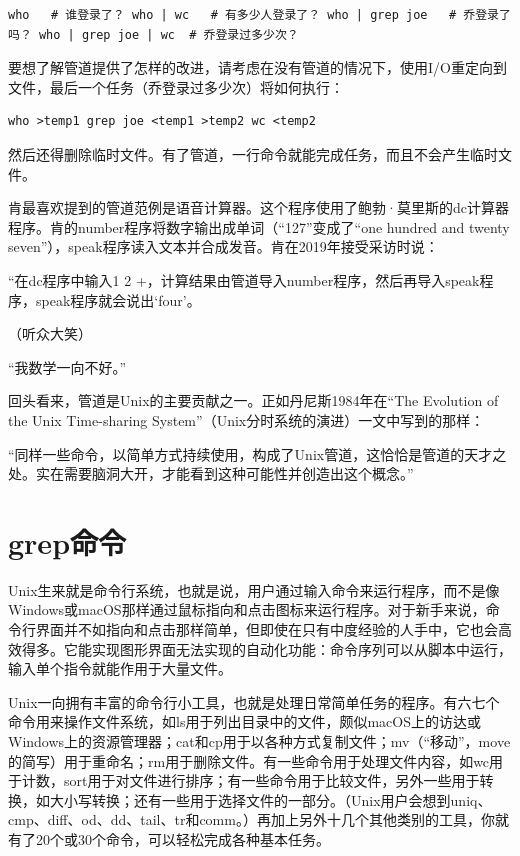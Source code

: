 \documentclass[a4paper,12pt,UTF8,twoside]{ctexbook}
\begin{document}
\begin{lstlisting}
who   # 谁登录了？ who | wc   # 有多少人登录了？ who | grep joe   # 乔登录了吗？ who | grep joe | wc  # 乔登录过多少次？
\end{lstlisting}

要想了解管道提供了怎样的改进，请考虑在没有管道的情况下，使用I/O重定向到文件，最后一个任务（乔登录过多少次）将如何执行：

\begin{lstlisting}
who >temp1 grep joe <temp1 >temp2 wc <temp2
\end{lstlisting}

然后还得删除临时文件。有了管道，一行命令就能完成任务，而且不会产生临时文件。

肯最喜欢提到的管道范例是语音计算器。这个程序使用了鲍勃·莫里斯的dc计算器程序。肯的number程序将数字输出成单词（“127”变成了“one hundred and twenty seven”），speak程序读入文本并合成发音。肯在2019年接受采访时说：

“在dc程序中输入1 2 +，计算结果由管道导入number程序，然后再导入speak程序，speak程序就会说出‘four’。

（听众大笑）

“我数学一向不好。”

回头看来，管道是Unix的主要贡献之一。正如丹尼斯1984年在“The Evolution of the Unix Time-sharing System”（Unix分时系统的演进）一文中写到的那样：

“同样一些命令，以简单方式持续使用，构成了Unix管道，这恰恰是管道的天才之处。实在需要脑洞大开，才能看到这种可能性并创造出这个概念。”

\section{grep命令}

Unix生来就是命令行系统，也就是说，用户通过输入命令来运行程序，而不是像Windows或macOS那样通过鼠标指向和点击图标来运行程序。对于新手来说，命令行界面并不如指向和点击那样简单，但即使在只有中度经验的人手中，它也会高效得多。它能实现图形界面无法实现的自动化功能：命令序列可以从脚本中运行，输入单个指令就能作用于大量文件。

Unix一向拥有丰富的命令行小工具，也就是处理日常简单任务的程序。有六七个命令用来操作文件系统，如ls用于列出目录中的文件，颇似macOS上的访达或Windows上的资源管理器；cat和cp用于以各种方式复制文件；mv（“移动”，move的简写）用于重命名；rm用于删除文件。有一些命令用于处理文件内容，如wc用于计数，sort用于对文件进行排序；有一些命令用于比较文件，另外一些用于转换，如大小写转换；还有一些用于选择文件的一部分。（Unix用户会想到uniq、cmp、diff、od、dd、tail、tr和comm。）再加上另外十几个其他类别的工具，你就有了20个或30个命令，可以轻松完成各种基本任务。
\end{document}
